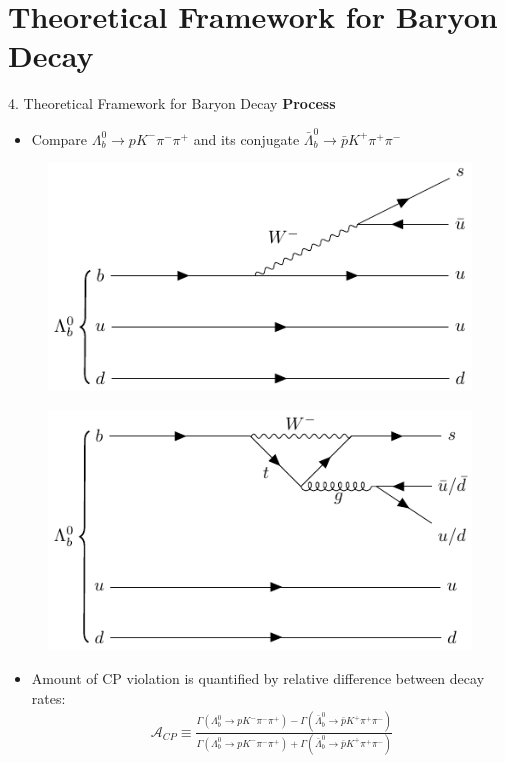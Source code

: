 \documentclass[xcolor=dvipsnames]{beamer}
\def\Ld{\Lambda}
\begin{document}
\section{Theoretical Framework for Baryon Decay}
\begin{frame}{4. Theoretical Framework for Baryon Decay}
\textbf{Process}\\
\begin{itemize}
    \item Compare $\Ld_{b}^{0}\to p K^{-}\pi^{-}\pi^{+}$ and its conjugate $\bar{\Ld}_{b}^{0}\to \bar{p}K^{+}\pi^{+}\pi^{-}$
\end{itemize}
\begin{minipage}[t]{0.45\textwidth}
\begin{figure}
    \centering
    \includegraphics[width=\linewidth]{lambdab_tree.pdf}
\end{figure}
\end{minipage}
\begin{minipage}[t]{0.45\textwidth}
\begin{figure}
    \centering
    \includegraphics[width=\linewidth]{lambdab_loop.pdf}
\end{figure}
\end{minipage}
\begin{itemize}
    \item Amount of CP violation is quantified by relative difference between decay rates:
    \begin{align*}
        \mathcal{A}_{CP}\equiv\frac{\Gamma(\Ld_{b}^{0}\to p K^{-}\pi^{-}\pi^{+})-\Gamma(\bar{\Ld}_{b}^{0}\to \bar{p}K^{+}\pi^{+}\pi^{-})}{\Gamma(\Ld_{b}^{0}\to p K^{-}\pi^{-}\pi^{+})+\Gamma(\bar{\Ld}_{b}^{0}\to \bar{p}K^{+}\pi^{+}\pi^{-})}
    \end{align*}
\end{itemize}
\end{frame}
\end{document}
